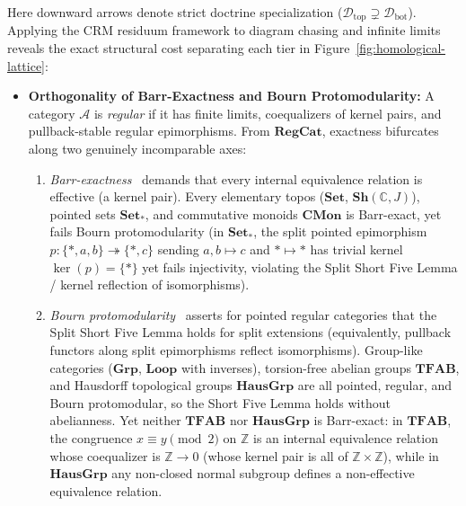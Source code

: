 \documentclass[10pt,twoside,openright]{book}
\theoremstyle{crmplain}
\theoremstyle{crmdef}
\theoremstyle{crmremark}
\begin{document}
Here downward arrows denote strict doctrine specialization ($\mathcal{D}_{\mathrm{top}} \supsetneq \mathcal{D}_{\mathrm{bot}}$). Applying the $\mathrm{CRM}$ residuum framework to diagram chasing and infinite limits reveals the exact structural cost separating each tier in Figure~\ref{fig:homological-lattice}:

\begin{itemize}[leftmargin=1.5em]

  \item \textbf{Orthogonality of Barr-Exactness and Bourn Protomodularity:} A category $\mathcal{A}$ is \emph{regular} if it has finite limits, coequalizers of kernel pairs, and pullback-stable regular epimorphisms. From $\mathbf{RegCat}$, exactness bifurcates along two genuinely incomparable axes:
  \begin{enumerate}[label=\textup{(\alph*)},leftmargin=1.6em]
    \item \emph{Barr-exactness}~\cite[\S\S A1.3--A1.4]{Johnstone02} demands that every internal equivalence relation is effective (a kernel pair). Every elementary topos ($\mathbf{Set}$, $\mathbf{Sh}(\mathbb{C}, J)$), pointed sets $\mathbf{Set}_*$, and commutative monoids $\mathbf{CMon}$ is Barr-exact, yet fails Bourn protomodularity (in $\mathbf{Set}_*$, the split pointed epimorphism $p : \{*, a, b\} \twoheadrightarrow \{*, c\}$ sending $a, b \mapsto c$ and $* \mapsto *$ has trivial kernel $\ker(p) = \{*\}$ yet fails injectivity, violating the Split Short Five Lemma / kernel reflection of isomorphisms).
    \item \emph{Bourn protomodularity}~\cite{Bourn91} asserts for pointed regular categories that the Split Short Five Lemma holds for split extensions (equivalently, pullback functors along split epimorphisms reflect isomorphisms). Group-like categories ($\mathbf{Grp}$, $\mathbf{Loop}$ with inverses), torsion-free abelian groups $\mathbf{TFAB}$, and Hausdorff topological groups $\mathbf{HausGrp}$ are all pointed, regular, and Bourn protomodular, so the Short Five Lemma holds without abelianness. Yet neither $\mathbf{TFAB}$ nor $\mathbf{HausGrp}$ is Barr-exact: in $\mathbf{TFAB}$, the congruence $x \equiv y \pmod 2$ on $\mathbb{Z}$ is an internal equivalence relation whose coequalizer is $\mathbb{Z} \to 0$ (whose kernel pair is all of $\mathbb{Z} \times \mathbb{Z}$), while in $\mathbf{HausGrp}$ any non-closed normal subgroup defines a non-effective equivalence relation.
  \end{enumerate}


\end{itemize}
\end{document}
